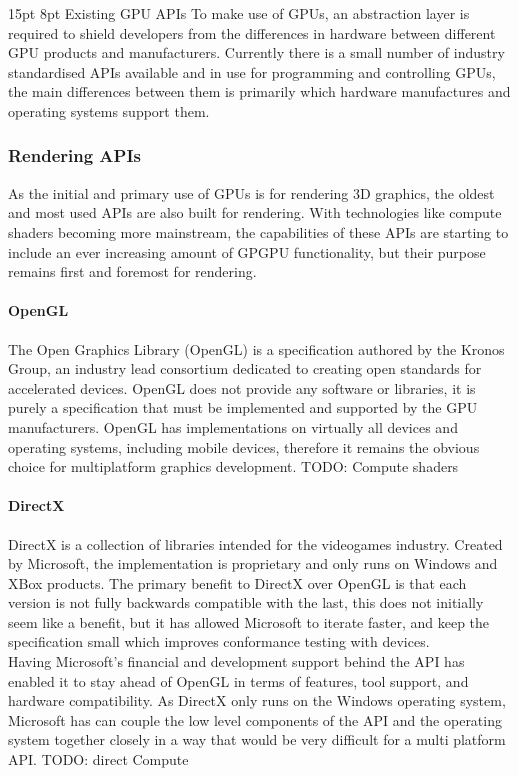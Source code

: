 \documentclass[12pt,a4paper]{article}
\makeatletter
\renewcommand\subsection{\@startsection {subsection}{1}{2mm} %
                               {15pt} %
                               {8pt} %
                               {\fontsize{13pt}{1em}\bfseries}}
\makeatother
\begin{document}
\subsection{Existing GPU APIs}
To make use of GPUs, an abstraction layer is required to shield developers from the differences in hardware between different GPU products and manufacturers. Currently there is a small number of industry standardised APIs available and in use for programming and controlling GPUs, the main differences between them is primarily which hardware manufactures and operating systems support them. 

\subsubsection{Rendering APIs}
As the initial and primary use of  GPUs is for rendering 3D graphics, the oldest and most used APIs are also built for rendering. With technologies like compute shaders becoming more mainstream, the capabilities of these APIs are starting to include an ever increasing amount of GPGPU functionality, but their purpose remains first and foremost for rendering.

\paragraph{OpenGL}
The Open Graphics Library (OpenGL) is a specification authored by the Kronos Group, an industry lead consortium dedicated to creating open standards for accelerated devices. OpenGL does not provide any software or libraries, it is purely a specification that must be implemented and supported by the GPU manufacturers. OpenGL has implementations on virtually all devices and operating systems, including mobile devices, therefore it remains the obvious choice for multiplatform graphics development.
TODO: Compute shaders

\paragraph{DirectX}
DirectX is a collection of libraries intended for the videogames industry. Created by Microsoft, the implementation is proprietary and only runs on Windows and XBox products. The primary benefit to DirectX over OpenGL is that each version is not fully backwards compatible with the last, this does not initially seem like a benefit, but it has allowed Microsoft to iterate faster, and keep the specification small which improves conformance testing with devices.
\\
Having Microsoft’s financial and development support behind the API has enabled it to stay ahead of OpenGL in terms of features, tool support, and hardware compatibility. As DirectX only runs on the Windows operating system, Microsoft has can couple the low level components of the API and the operating system together closely in a way that would be very difficult for a multi platform API.
TODO: direct Compute
\end{document}

